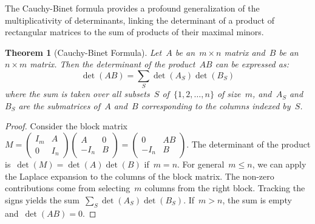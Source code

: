 \documentclass[12pt]{article}
\newtheorem{theorem}{Theorem}[section]
\begin{document}
\noindent The Cauchy-Binet formula provides a profound generalization of the multiplicativity of determinants, linking the determinant of a product of rectangular matrices to the sum of products of their maximal minors.
\begin{theorem}[Cauchy-Binet Formula]
Let~$A$ be an~$m \times n$ matrix and~$B$ be an~$n \times m$ matrix. Then the determinant of the product~$AB$ can be expressed as:
\[ \det(AB) = \sum_{S} \det(A_S) \det(B_S) \]
where the sum is taken over all subsets~$S$ of~$\{1, 2, \dots, n\}$ of size~$m$, and~$A_S$ and~$B_S$ are the submatrices of~$A$ and~$B$ corresponding to the columns indexed by~$S$.
\end{theorem}
\begin{proof}
Consider the block matrix~$M = \begin{pmatrix} I_m & A \\ 0 & I_n \end{pmatrix} \begin{pmatrix} A & 0 \\ -I_n & B \end{pmatrix} = \begin{pmatrix} 0 & AB \\ -I_n & B \end{pmatrix}$. The determinant of the product is~$\det(M) = \det(A)\det(B)$ if~$m=n$. For general~$m \le n$, we can apply the Laplace expansion to the columns of the block matrix. The non-zero contributions come from selecting~$m$ columns from the right block. Tracking the signs yields the sum~$\sum_S \det(A_S)\det(B_S)$. If~$m > n$, the sum is empty and~$\det(AB) = 0$.
\end{proof}
\end{document}
